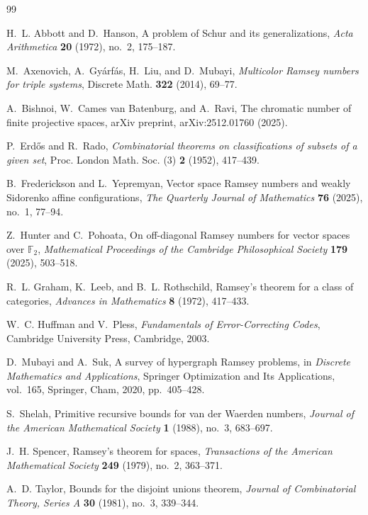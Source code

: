 \documentclass[a4paper,11pt]{amsproc}
\theoremstyle{plain}
\theoremstyle{definition}
\begin{document}
\begin{thebibliography}{99}

H.~L. Abbott and D.~Hanson,
\newblock A problem of Schur and its generalizations,
\newblock \emph{Acta Arithmetica} \textbf{20} (1972), no.~2, 175--187.


M.~Axenovich, A.~Gy\'arf\'as, H.~Liu, and D.~Mubayi,
\emph{Multicolor Ramsey numbers for triple systems},
Discrete Math. \textbf{322} (2014), 69--77.

A.~Bishnoi, W.~Cames van Batenburg, and A.~Ravi,
\newblock The chromatic number of finite projective spaces,
\newblock arXiv preprint, arXiv:2512.01760 (2025).


P.~Erd\H{o}s and R.~Rado,
\emph{Combinatorial theorems on classifications of subsets of a
given set},
Proc. London Math. Soc. (3) \textbf{2} (1952), 417--439.


B.~Frederickson and L.~Yepremyan,
\newblock Vector space Ramsey numbers and weakly Sidorenko affine configurations,
\newblock \emph{The Quarterly Journal of Mathematics} \textbf{76} (2025), no.~1, 77--94.

Z.~Hunter and C.~Pohoata,
\newblock On off-diagonal Ramsey numbers for vector spaces over $\mathbb{F}_{2}$,
\newblock \emph{Mathematical Proceedings of the Cambridge Philosophical Society} \textbf{179} (2025), 503--518.

R.~L. Graham, K.~Leeb, and B.~L. Rothschild,
\newblock Ramsey's theorem for a class of categories,
\newblock \emph{Advances in Mathematics} \textbf{8} (1972), 417--433.

W.~C. Huffman and V.~Pless,
\emph{Fundamentals of Error-Correcting Codes},
Cambridge University Press, Cambridge, 2003.

D.~Mubayi and A.~Suk,
\newblock A survey of hypergraph Ramsey problems,
\newblock in \emph{Discrete Mathematics and Applications}, Springer Optimization and Its Applications, vol.~165,
\newblock Springer, Cham, 2020, pp.~405--428.


S.~Shelah,
\newblock Primitive recursive bounds for van der Waerden numbers,
\newblock \emph{Journal of the American Mathematical Society} \textbf{1} (1988), no.~3, 683--697.



J.~H. Spencer,
\newblock Ramsey's theorem for spaces,
\newblock \emph{Transactions of the American Mathematical Society} \textbf{249} (1979), no.~2, 363--371.


A.~D. Taylor,
\newblock Bounds for the disjoint unions theorem,
\newblock \emph{Journal of Combinatorial Theory, Series A} \textbf{30} (1981), no.~3, 339--344.




\end{thebibliography}
\end{document}
